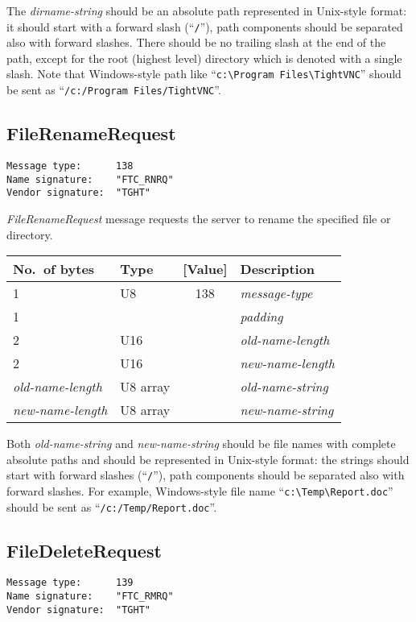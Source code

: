 \documentclass[a4paper]{article}
\newcommand{\typestr}[1]{\textit{#1}}
\begin{document}
The \typestr{dirname-string} should be an absolute path represented in
Unix-style format: it should start with a forward slash
(``\verb|/|''), path components should be separated also with forward
slashes. There should be no trailing slash at the end of the path,
except for the root (highest level) directory which is denoted with a
single slash. Note that Windows-style path like
``\verb|c:\Program Files\TightVNC|'' should be sent as
``\verb|/c:/Program Files/TightVNC|''.

\newpage
\subsection{FileRenameRequest}
\begin{verbatim}
Message type:      138
Name signature:    "FTC_RNRQ"
Vendor signature:  "TGHT"
\end{verbatim}

\typestr{FileRenameRequest} message requests the server to rename the
specified file or directory.

\begin{tabular}{l|lc|l} \hline
No.\ of bytes & Type & [Value] & Description \\ \hline
1 & U8  & 138 & \typestr{message-type} \\
1 &     &     & \typestr{padding} \\
2 & U16 &     & \typestr{old-name-length} \\
2 & U16 &     & \typestr{new-name-length} \\
\typestr{old-name-length} & U8 array & & \typestr{old-name-string} \\
\typestr{new-name-length} & U8 array & & \typestr{new-name-string} \\
\hline\end{tabular}

Both \typestr{old-name-string} and \typestr{new-name-string} should be
file names with complete absolute paths and should be represented in
Unix-style format: the strings should start with forward slashes
(``\verb|/|''), path components should be separated also with forward
slashes. For example, Windows-style file name
``\verb|c:\Temp\Report.doc|'' should be sent as
``\verb|/c:/Temp/Report.doc|''.


\newpage
\subsection{FileDeleteRequest}
\begin{verbatim}
Message type:      139
Name signature:    "FTC_RMRQ"
Vendor signature:  "TGHT"
\end{verbatim}
\end{document}
